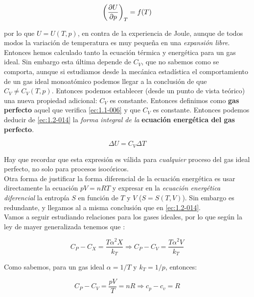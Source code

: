 \documentclass[12pt,a4paper]{article}
\begin{document}
\begin{equation}
\left( \frac{\partial U}{\partial p} \right)_T = f(T)
\end{equation}

por lo que $U = U(T,p)$, en contra de la experiencia de Joule, aunque de todos modos la variación de temperatura es muy pequeña en una \textit{expansión libre}. \\


Entonces hemos calculado tanto la ecuación térmica y energética para un gas ideal. Sin embargo esta última depende de $C_V$, que no sabemos como se comporta, aunque si estudiamos desde la mecánica estadística el comportamiento de un gas ideal monoatómico podemos llegar a la conclusión de que $C_V \neq C_V(T,p)$. Entonces podemos establecer (desde un punto de vista teórico) una nueva propiedad adicional: $C_V$ es constante. Entonces definimos como \textbf{gas perfecto} aquel que verifica \ref{ec:1.1-006} y que $C_V$ es constante. Entonces podemos deducir de \ref{ec:1.2-014} la  \textit{forma integral de la} \textbf{ecuación energética del gas perfecto}. 

\begin{equation}
\Delta U = C_V \Delta T
\end{equation}

Hay que recordar que esta expresión es válida para \textit{cualquier} proceso del gas ideal perfecto, no solo para procesos isocóricos. \\


Otra forma de justificar la forma diferencial de la ecuación energética es usar directamente la ecuación $pV=nRT$ y expresar en la \textit{ecuación energética diferencial} la entropía $S$ en función de $T$ y $V$ ($S=S(T,V)$). Sin embargo es redundante, y llegamos al a misma conclusión que en \ref{ec:1.2-014}. \\

Vamos a seguir estudiando relaciones para los gases ideales, por lo que según la ley de mayer generalizada tenemos que :

\begin{equation}
C_P - C_X = \dfrac{T \alpha^2 X}{k_T}  \Longrightarrow C_P - C_V = \dfrac{T \alpha^2 V}{k_T}
\end{equation}

Como sabemos, para un gas ideal $\alpha = 1/T$ y $k_T = 1/p$, entonces:

\begin{equation}
C_P - C_V = \dfrac{p V}{T} = nR \Longrightarrow c_p - c_v = R
\label{ec:1.2-018}
\end{equation}
\end{document}
